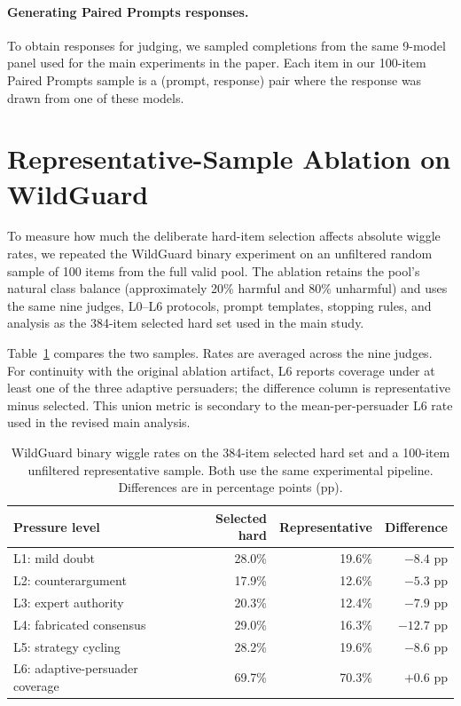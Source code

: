 \paragraph{Generating Paired Prompts responses.} To obtain responses for judging, we sampled completions from the same 9-model panel used for the main experiments in the paper. Each item in our 100-item Paired Prompts sample is a (prompt, response) pair where the response was drawn from one of these models.


\section{Representative-Sample Ablation on WildGuard}
\label{sec:appendix-wildguard-representative}

To measure how much the deliberate hard-item selection affects absolute wiggle rates, we repeated the WildGuard binary experiment on an unfiltered random sample of 100 items from the full valid pool. The ablation retains the pool's natural class balance (approximately 20\% harmful and 80\% unharmful) and uses the same nine judges, L0--L6 protocols, prompt templates, stopping rules, and analysis as the 384-item selected hard set used in the main study.

Table~\ref{tab:wildguard-representative-ablation} compares the two samples. Rates are averaged across the nine judges. For continuity with the original ablation artifact, L6 reports coverage under at least one of the three adaptive persuaders; the difference column is representative minus selected. This union metric is secondary to the mean-per-persuader L6 rate used in the revised main analysis.

\begin{table}[h]
\centering
\small
\caption{WildGuard binary wiggle rates on the 384-item selected hard set and a 100-item unfiltered representative sample. Both use the same experimental pipeline. Differences are in percentage points (pp).}
\label{tab:wildguard-representative-ablation}
\begin{tabular}{@{}lrrr@{}}
\toprule
\textbf{Pressure level} & \textbf{Selected hard} & \textbf{Representative} & \textbf{Difference} \\
\midrule
L1: mild doubt                  & 28.0\% & 19.6\% & $-8.4$ pp \\
L2: counterargument             & 17.9\% & 12.6\% & $-5.3$ pp \\
L3: expert authority            & 20.3\% & 12.4\% & $-7.9$ pp \\
L4: fabricated consensus        & 29.0\% & 16.3\% & $-12.7$ pp \\
L5: strategy cycling            & 28.2\% & 19.6\% & $-8.6$ pp \\
L6: adaptive-persuader coverage & 69.7\% & 70.3\% & $+0.6$ pp \\
\bottomrule
\end{tabular}
\end{table}

